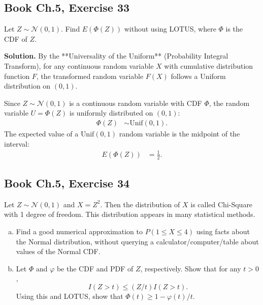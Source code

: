 \documentclass[11pt,a4paper]{article}
\begin{document}
\vspace{10pt}
\subsection{Book Ch.5, Exercise 33}
\begin{tcolorbox}[title={Book Ch.5, Exercise 33}]
Let $Z \sim \mathcal{N}(0, 1)$. Find $E(\Phi(Z))$ without using LOTUS, where $\Phi$ is the CDF of $Z$.
\end{tcolorbox}

\noindent \textbf{Solution.} By the **Universality of the Uniform** (Probability Integral Transform), for any continuous random variable $X$ with cumulative distribution function $F$, the transformed random variable $F(X)$ follows a Uniform distribution on $(0, 1)$. 

Since $Z \sim \mathcal{N}(0, 1)$ is a continuous random variable with CDF $\Phi$, the random variable $U = \Phi(Z)$ is uniformly distributed on $(0, 1)$:
\begin{align*}
\Phi(Z) &\sim \text{Unif}(0, 1).
\end{align*}
The expected value of a $\text{Unif}(0, 1)$ random variable is the midpoint of the interval:
\begin{align*}
E(\Phi(Z)) &= \frac{1}{2}.
\end{align*}

\vspace{10pt}
\subsection{Book Ch.5, Exercise 34}
\begin{tcolorbox}[title={Book Ch.5, Exercise 34}]
Let $Z \sim \mathcal{N}(0, 1)$ and $X = Z^2$. Then the distribution of $X$ is called Chi-Square with 1 degree of freedom. This distribution appears in many statistical methods.
\begin{enumerate}[(a)]
\item Find a good numerical approximation to $P(1 \le X \le 4)$ using facts about the Normal distribution, without querying a calculator/computer/table about values of the Normal CDF.
\item Let $\Phi$ and $\varphi$ be the CDF and PDF of $Z$, respectively. Show that for any $t > 0$,
\[
I(Z > t) \le (Z/t) I(Z > t).
\]
Using this and LOTUS, show that $\Phi(t) \ge 1 - \varphi(t)/t$.
\end{enumerate}
\end{tcolorbox}
\end{document}
